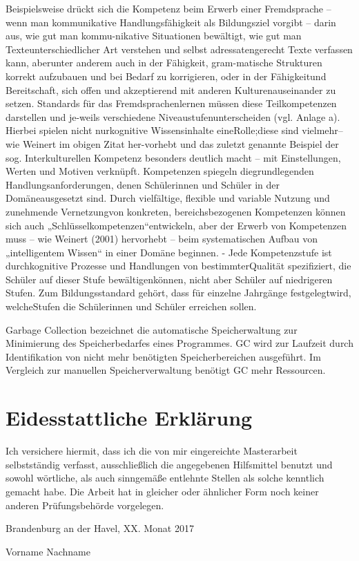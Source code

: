 \documentclass[
12pt,
english,
ngerman,
headsepline,
twoside,
openright,
numbers=noenddot,version=first
]{scrreprt}
\begin{document}
Beispielsweise drückt sich die Kompetenz beim Erwerb einer Fremdsprache – wenn man kommunikative Handlungsfähigkeit als Bildungsziel vorgibt – darin aus, wie gut man kommu-nikative Situationen bewältigt, wie gut man Texteunterschiedlicher Art verstehen und selbst adressatengerecht Texte verfassen kann, aberunter anderem auch in der Fähigkeit, gram-matische Strukturen korrekt aufzubauen und bei Bedarf zu korrigieren, oder in der Fähigkeitund Bereitschaft, sich offen und akzeptierend mit anderen Kulturenauseinander zu setzen. Standards für das Fremdsprachenlernen müssen diese Teilkompetenzen darstellen und je-weils verschiedene Niveaustufenunterscheiden (vgl. Anlage a). Hierbei spielen nicht nurkognitive Wissensinhalte eineRolle;diese sind vielmehr– wie Weinert im obigen Zitat her-vorhebt und das zuletzt genannte Beispiel der sog. Interkulturellen Kompetenz besonders deutlich macht – mit Einstellungen, Werten und Motiven verknüpft.
Kompetenzen spiegeln diegrundlegenden Handlungsanforderungen, denen Schülerinnen und Schüler in der Domäneausgesetzt sind. Durch vielfältige, flexible und variable Nutzung und zunehmende Vernetzungvon konkreten, bereichsbezogenen Kompetenzen können sich auch „Schlüsselkompetenzen“entwickeln, aber der Erwerb von Kompetenzen muss – wie Weinert (2001) hervorhebt – beim systematischen Aufbau von „intelligentem Wissen“ in einer Domäne beginnen.
- Jede Kompetenzstufe ist durchkognitive Prozesse und Handlungen von bestimmterQualität spezifiziert, die Schüler auf dieser Stufe bewältigenkönnen, nicht aber Schüler auf niedrigeren Stufen. Zum Bildungsstandard gehört, dass für einzelne Jahrgänge festgelegtwird, welcheStufen die Schülerinnen und Schüler erreichen sollen.
\begin{acronym}[Bash]



\glqq Garbage Collection\grqq{} bezeichnet die automatische Speicherwaltung zur Minimierung des Speicherbedarfes eines Programmes.
\ac{GC} wird zur Laufzeit durch Identifikation von nicht mehr benötigten Speicherbereichen ausgeführt.
Im Vergleich zur manuellen Speicherverwaltung benötigt \ac{GC} mehr Ressourcen.

\end{acronym}





\chapter*{Eidesstattliche Erklärung}

Ich versichere hiermit, dass ich die von mir eingereichte Masterarbeit selbstständig verfasst, ausschließlich die angegebenen Hilfsmittel benutzt und sowohl wörtliche, als auch sinngemäße entlehnte Stellen als solche kenntlich gemacht habe. Die Arbeit hat in gleicher oder ähnlicher Form noch keiner anderen Prüfungsbehörde vorgelegen.

Brandenburg an der Havel, XX. Monat 2017

\vspace{3cm}

Vorname Nachname
\end{document}
